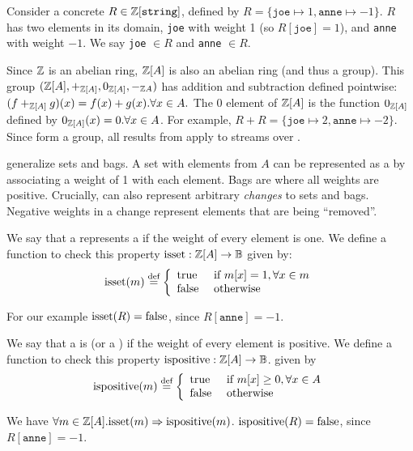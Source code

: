 \ifzsetexamples
Consider a concrete \zr $R \in \mathbb{Z}[\texttt{string}]$,
defined by $R = \{ \texttt{joe} \mapsto 1, \texttt{anne} \mapsto -1 \}$.
$R$ has two elements in its domain,
\texttt{joe} with weight 1 (so $R[\texttt{joe}] = 1$),
and \texttt{anne} with weight $-1$.
We say \texttt{joe} $\in R$ and \texttt{anne} $\in R$.
\fi

Since $\mathbb{Z}$ is an abelian ring, $\mathbb{Z}[A]$ is also an abelian ring (and thus a group).  This group
$(\mathbb{Z}[A], +_{\mathbb{Z}[A]}, 0_{\mathbb{Z}[A]}, -_{\mathbb{Z}{A}})$ has addition and subtraction defined pointwise:
$(f +_{\mathbb{Z}[A]} g)(x) = f(x) + g(x) . \forall x \in A.$
The $0$ element of $\mathbb{Z}[A]$ is the function $0_{\mathbb{Z}[A]}$ defined by $0_{\mathbb{Z}[A]}(x) = 0 .
\forall x \in A$.  For example, $R + R =  \{ \texttt{joe} \mapsto 2, \texttt{anne} \mapsto -2 \}$.
Since \zrs form a group, all results from  apply to streams over \zrs.

\zrs generalize sets and bags.  A set with elements from $A$
can be represented as a \zr by associating a weight of 1 with each element.
Bags are \zrs where all weights are positive.  Crucially, \zrs
can also represent arbitrary \emph{changes} to sets and bags.
Negative weights in a change represent elements that are being ``removed''.

\begin{definition}
We say that a \zr represents a  if the weight of every
element is one.  We define a function to check this property
$\mbox{isset} : \mathbb{Z}[A] \rightarrow \mathbb{B}$
given by:
$$\isset(m) \defn \left\{
\begin{array}{ll}
  \mbox{true} & \mbox{ if } m[x] = 1, \forall x \in m \\
  \mbox{false} & \mbox{ otherwise}
\end{array}
\right.
$$
\end{definition}

\ifzsetexamples
For our example $\mbox{isset}(R) = \mbox{false}$, since $R[\texttt{anne}] = -1$.
\fi

\begin{definition}
We say that a \zr is  (or a ) if the weight of every element is
positive.  We define a function to check this property
$\mbox{ispositive} : \mathbb{Z}[A] \rightarrow \mathbb{B}$.
given by
$$\ispositive(m) \defn \left\{
\begin{array}{ll}
  \mbox{true} & \mbox{ if } m[x] \geq 0, \forall x \in A \\
  \mbox{false} & \mbox{ otherwise}
\end{array}
\right.$$
\end{definition}
We have $\forall m \in \mathbb{Z}[A] . \mbox{isset}(m) \Rightarrow \mbox{ispositive}(m)$.
\ifzsetexamples
$\mbox{ispositive}(R) = \mbox{false}$, since $R[\texttt{anne}] = -1$.
\fi


